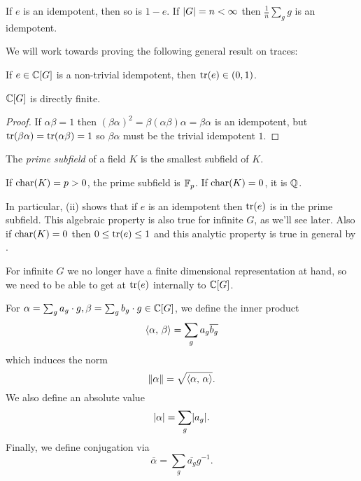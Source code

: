 \begin{remark}
    If $e$ is an idempotent, then so is $1-e$.
    If $\lvert G \rvert = n < \infty$ then $\frac{1}{n} \sum_g g$ is an idempotent.
\end{remark}

We will work towards proving the following general result on traces:
\begin{theorem}[Kaplansky]
    \label{theorem:kaplansky}
    If $e \in \mathbb{C}[G]$ is a non-trivial idempotent, then $\operatorname{tr}(e) \in (0, 1)$.
\end{theorem}

\begin{corollary}
    $\mathbb{C}[G]$ is directly finite.
\end{corollary}

\begin{proof}
    If $\alpha \beta = 1$ then $(\beta \alpha)^2 = \beta (\alpha \beta) \alpha = \beta \alpha$ is an idempotent, but $\operatorname{tr}(\beta \alpha) = \operatorname{tr}(\alpha \beta) = 1$ so $\beta \alpha$ must be the trivial idempotent $1$.
\end{proof}

\begin{definition}
    The \emph{prime subfield} of a field $K$ is the smallest subfield of $K$.
\end{definition}
If $\mathrm{char}(K) = p > 0$, the prime subfield is $\mathbb{F}_p$.
If $\mathrm{char}(K) = 0$, it is $\mathbb{Q}$.

In particular,  (ii) shows that if $e$ is an idempotent then $\operatorname{tr}(e)$ is in the prime subfield.
This algebraic property is also true for infinite $G$, as we'll see later. %
Also if $\mathrm{char}(K) = 0$ then $0 \leq \operatorname{tr}(e) \leq 1$ and this analytic property is true in general by .

For infinite $G$ we no longer have a finite dimensional representation at hand, so we need to be able to get at $\operatorname{tr}(e)$ internally to $\mathbb{C}[G]$.

\begin{definition}
    For $\alpha = \sum_g a_g \cdot g, \beta = \sum_g b_g \cdot g \in \mathbb{C}[G]$, we define the inner product \[
        \langle \alpha, \, \beta \rangle = \sum_g a_g \overline{b_g}
    \] which induces the norm \[
        \left\lVert \alpha \right\rVert = \sqrt{\langle \alpha, \, \alpha \rangle}.
    \] We also define an absolute value \[
        \lvert \alpha \rvert = \sum_g \lvert a_g \rvert.
    \] Finally, we define conjugation via \[
        \overline{\alpha} = \sum_g \overline{a_g} g^{-1}.
    \]
\end{definition}

